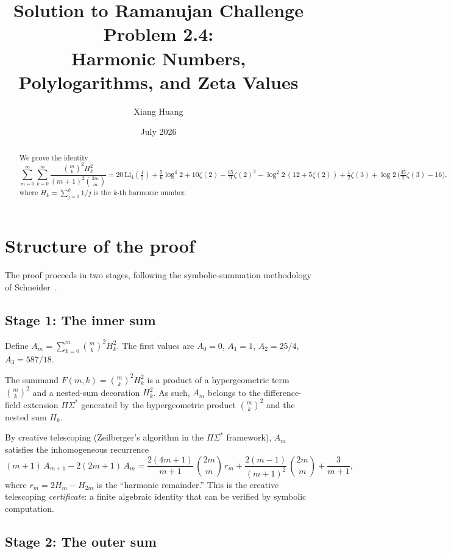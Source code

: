 \documentclass[11pt]{article}
\title{Solution to Ramanujan Challenge Problem 2.4:\\
Harmonic Numbers, Polylogarithms, and Zeta Values}
\author{Xiang Huang}
\date{July 2026}
\begin{document}
\maketitle

\begin{abstract}
We prove the identity
\[
\sum_{m=0}^{\infty} \sum_{k=0}^{m}
\frac{\binom{m}{k}^2 H_k^2}{(m+1)^2 \binom{2m}{m}}
= 20\,\text{Li}_4\!\left(\tfrac{1}{2}\right)
+ \tfrac{5}{6}\log^4 2 + 10\zeta(2) - \tfrac{65}{9}\zeta(2)^2
- \log^2\!2\,(12 + 5\zeta(2))
+ \tfrac{1}{2}\zeta(3) + \log 2\,\bigl(\tfrac{35}{2}\zeta(3) - 16\bigr),
\]
where $H_k = \sum_{j=1}^{k} 1/j$ is the $k$-th harmonic number.
\end{abstract}

\section{Structure of the proof}

The proof proceeds in two stages, following the symbolic-summation
methodology of Schneider~\cite{Schneider2007}.

\subsection{Stage 1: The inner sum}

Define $A_m = \sum_{k=0}^{m} \binom{m}{k}^2 H_k^2$.
The first values are $A_0 = 0$, $A_1 = 1$, $A_2 = 25/4$,
$A_3 = 587/18$.

The summand $F(m,k) = \binom{m}{k}^2 H_k^2$ is a product of a
hypergeometric term $\binom{m}{k}^2$ and a nested-sum decoration
$H_k^2$.  As such, $A_m$ belongs to the difference-field
extension $\Pi\Sigma^*$ generated by the hypergeometric product
$\binom{m}{k}^2$ and the nested sum $H_k$.

By creative telescoping (Zeilberger's algorithm in the
$\Pi\Sigma^*$ framework), $A_m$ satisfies the inhomogeneous
recurrence
\begin{equation}\label{eq:CT}
(m+1)\,A_{m+1} - 2(2m+1)\,A_m
= \frac{2(4m+1)}{m+1}\,\binom{2m}{m}\,r_m
  + \frac{2(m-1)}{(m+1)^2}\,\binom{2m}{m}
  + \frac{3}{m+1},
\end{equation}
where $r_m = 2H_m - H_{2m}$ is the ``harmonic remainder.''
This is the creative telescoping \emph{certificate}: a finite
algebraic identity that can be verified by symbolic computation.

\subsection{Stage 2: The outer sum}
\end{document}
